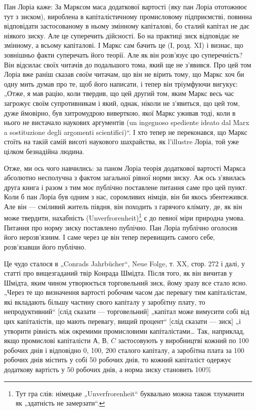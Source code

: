Пан Лоріа каже: За Марксом маса додаткової вартості (яку
пан Лоріа ототожнює тут з зиском), вироблена в капіталістичному
промисловому підприємстві, повинна відповідати застосованому
в ньому змінному капіталові, бо сталий капітал не дає
ніякого зиску. Але це суперечить дійсності. Бо на практиці зиск
відповідає не змінному, а всьому капіталові. І Маркс сам бачить
це (І, розд. XI) і визнає, що зовнішньо факти суперечать
його теорії. Але як він розв’язує цю суперечність? Він відсилає
своїх читачів до подальшого тома, який ще не з’явився.
Про цей том Лоріа вже раніш сказав \emph{своїм} читачам, що він
не вірить тому, що Маркс хоч би одну мить думав про те,
щоб його написати, і тепер він тріумфуючи вигукує: „Отже,
я мав рацію, коли твердив, що цей другий том, яким Маркс
весь час загрожує своїм супротивникам і який, однак, ніколи
не з’явиться, що цей том, дуже ймовірно, був хитромудрою
виверткою, якої Маркс уживав тоді, коли в нього не
вистачало наукових аргументів (un ingegnoso spediente ideato
dal Marx a sostituzione degli argomenti scientifici)“. І хто тепер
не переконався, що Маркс стоїть на такій самій висоті наукового
шахрайства, як l'illustre Лоріа, той уже цілком безнадійна
людина.

Отже, ми ось чого навчились: за паном Лоріа теорія додаткової
вартості Маркса абсолютно несполучна з фактом загальної
рівної норми зиску. Аж ось з’явилась друга книга і разом
з тим моє публічно поставлене питання саме про цей пункт.
Коли б пан Лоріа був одним з нас, соромливих німців, він би
якось збентежився. Але він — сміливий житель півдня, він походить
з гарячого клімату, де, як він може твердити, нахабність
(Unverfrorenheit)\footnote*{Тут гра слів: німецьке „Unverfrorenheit“ буквально можна також тлумачити
як „здатність не замерзати“. } є до певної міри природна умова. Питання
про норму зиску поставлено публічно. Пан Лоріа публічно оголосив
його нерозв’язним. І саме через це він тепер перевищить
самого себе, розв’язавши його публічно.

Це чудо сталося в „Conrads Jahrbücher“, Neue Folge, т. XX,
стор. 272 і далі, у статті про вищезгаданий твір Конрада Шмідта.
Після того, як він вичитав у Шмідта, яким чином утворюється
торговельний зиск, йому зразу все стало ясно. „Через те що
визначення вартості робочим часом дає перевагу тим капіталістам,
які вкладають більшу частину свого капіталу у заробітну
плату, то непродуктивний“ [слід сказати — торговельний] „капітал
може вимусити собі від цих капіталістів, що мають перевагу,
вищий процент“ [слід сказати — зиск] „і утворити рівність
між окремими промисловими капіталістами\dots{} Так, наприклад,
якщо промислові капіталісти $А$, $В$, $C$ застосовують у виробництві
кожний по 100 робочих днів і відповідно 0, 100, 200
сталого капіталу, а заробітна плата за 100 робочих днів містить
у собі 50 робочих днів, то кожний капіталіст одержує додаткову
вартість у 50 робочих днів, а норма зиску становить 100\%
\parbreak{}  %
